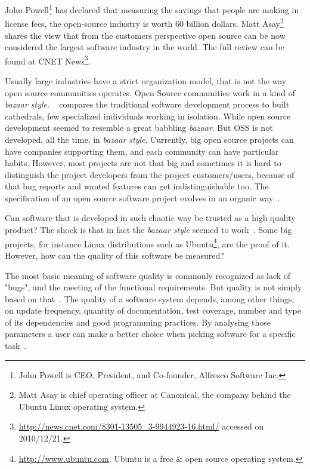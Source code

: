 \documentclass[sle]{llncs}
\begin{document}
\textsf{John Powell}\footnote{John Powell is CEO, President, and Co-founder, Alfresco Software Inc.} 
has declared that measuring the savings that people are making in license fees, the open-source industry is worth 60 billion dollars.
\textsf{Matt Asay}\footnote{Matt Asay is chief operating officer at Canonical, the company behind the Ubuntu Linux operating system.}
shares the view that from the customers perspective open source can be now considered the largest software industry in the world.
The full review can be found at \textsf{CNET News}\footnote{\url{http://news.cnet.com/8301-13505\_3-9944923-16.html/} accessed on 2010/12/21.}.

Usually large industries have a strict organization model, that is not the way open source communities operates. 
Open Source communities work in a kind of \textit{bazaar style}. 
~\cite{raymondcathedral} compares the traditional software development process to built cathedrals,
few specialized individuals working in isolation. 
While open source development seemed to resemble a great babbling \textit{bazaar}.
But OSS is not developed, all the time, in \textit{bazaar style}.
Currently, big open source projects can have companies supporting them, and each community can have particular habits.
However, most projects are not that big and sometimes it is hard to distinguish the project developers from the project customers/users,
because of that bug reports and wanted features can get indistinguishable too. 
The specification of an open source software project evolves in an organic way~\cite{capiluppicathedral}.

Can software that is developed in such chaotic way be trusted as a high quality product?
The shock is that in fact the \textit{bazaar style} seemed to work~\cite{halloran2002high}.
Some big projects, for instance Linux distributions such as \textsf{Ubuntu}\footnote{\url{http://www.ubuntu.com}. 
Ubuntu is a free \& open source operating system.}, 
are the proof of it.
However, how can the quality of this software be measured?

The most basic meaning of software quality is commonly recognized as lack of "bugs", and the meeting of the functional requirements.
But quality is not simply based on that~\cite{gousios2007software}.
The quality of a software system depends, among other things, on update frequency, quantity of documentation, test coverage, 
number and type of its dependencies and good programming practices.
By analysing those parameters a user can make a better choice when picking software for a specific task~\cite{marchenko2007predicting}.
\end{document}
